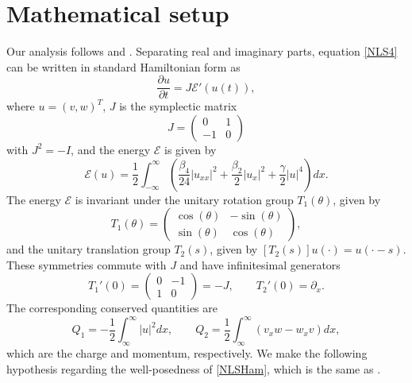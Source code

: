 \documentclass[12pt]{elsarticle}
\def\calE{{\mathcal E}}
\begin{document}
\section{Mathematical setup}\label{sec:setup}

Our analysis follows \cite{Grillakis1990} and \cite[Section 5.2]{Kapitula2013}. Separating real and imaginary parts, equation \cref{NLS4} can be written in standard Hamiltonian form as 
\begin{equation}\label{NLSHam}
\frac{\partial u}{\partial t} = J \calE'(u(t)),
\end{equation}
where $u = (v, w)^T$, $J$ is the symplectic matrix
\begin{equation}
J = \begin{pmatrix}
0 & 1 \\ -1 & 0
\end{pmatrix}
\end{equation}
with $J^2 = -I$, and the energy $\calE$ is given by
\begin{equation}\label{defH}
\calE(u) = \frac{1}{2} \int_{-\infty}^\infty \left( \frac{\beta_4}{24}|u_{xx}|^2 + \frac{\beta_2}{2}|u_{x}|^2 + \frac{\gamma}{2} |u|^4 \right) dx.
\end{equation}
The energy $\mathcal{E}$ is invariant under the unitary rotation group $T_1(\theta)$, given by
\begin{equation}\label{eq:T1}
T_1(\theta) = \begin{pmatrix}
\cos(\theta) & -\sin(\theta) \\ 
\sin(\theta) & \cos(\theta)
\end{pmatrix},
\end{equation}
and the unitary translation group $T_2(s)$, given by $[T_2(s)]u(\cdot) = u(\cdot - s)$. These symmetries commute with $J$ and have infinitesimal generators
\begin{equation}\label{eq:Tgens}
T_1'(0) = \begin{pmatrix}
0 & -1 \\ 
1 & 0
\end{pmatrix} = -J, \qquad T_2'(0) = \partial_x.
\end{equation}
The corresponding conserved quantities are
\begin{equation}
Q_1 = -\frac{1}{2} \int_{\infty}^\infty |u|^2 dx,
\qquad Q_2 = \frac{1}{2} \int_{\infty}^\infty
\left( v_x w - w_x v \right) dx,
\end{equation}
which are the charge and momentum, respectively. We make the following hypothesis regarding the well-posedness of \cref{NLSHam}, which is the same as \cite[Assumption 1]{Grillakis1990}.
\end{document}
